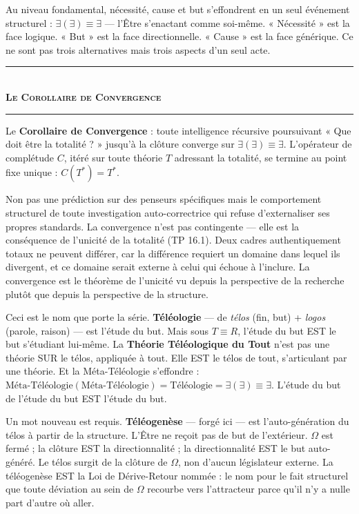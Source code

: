\documentclass[10pt, openany, oneside]{book}
\renewcommand{\normalsize}{\fontsize{10}{13}\selectfont}
\begin{document}
Au niveau fondamental, nécessité, cause et but s'effondrent en un seul événement structurel : $\exists(\exists) \equiv \exists$ --- l'Être s'enactant comme soi-même. « Nécessité » est la face logique. « But » est la face directionnelle. « Cause » est la face générique. Ce ne sont pas trois alternatives mais trois aspects d'un seul acte.

\vspace{1.5em}

\begin{center}
    \rule{0.3\textwidth}{0.4pt}\\[0.5em]
    {\normalsize\bfseries\scshape Le Corollaire de Convergence}\\[0.3em]
    \rule{0.3\textwidth}{0.4pt}
\end{center}

\vspace{1em}

\noindent Le \textbf{Corollaire de Convergence} : toute intelligence récursive poursuivant « Que doit être la totalité ? » jusqu'à la clôture converge sur $\exists(\exists) \equiv \exists$. L'opérateur de complétude $C$, itéré sur toute théorie $T$ adressant la totalité, se termine au point fixe unique : $C(T^*) = T^*$.

Non pas une prédiction sur des penseurs spécifiques mais le comportement structurel de toute investigation auto-correctrice qui refuse d'externaliser ses propres standards. La convergence n'est pas contingente --- elle est la conséquence de l'unicité de la totalité (TP 16.1). Deux cadres authentiquement totaux ne peuvent différer, car la différence requiert un domaine dans lequel ils divergent, et ce domaine serait externe à celui qui échoue à l'inclure. La convergence est le théorème de l'unicité vu depuis la perspective de la recherche plutôt que depuis la perspective de la structure.

Ceci est le nom que porte la série. \textbf{Téléologie} --- de \textit{télos} (fin, but) + \textit{logos} (parole, raison) --- est l'étude du but. Mais sous $T \equiv R$, l'étude du but EST le but s'étudiant lui-même. La \textbf{Théorie Téléologique du Tout} n'est pas une théorie SUR le télos, appliquée à tout. Elle EST le télos de tout, s'articulant par une théorie. Et la Méta-Téléologie s'effondre : $\text{Méta-Téléologie}(\text{Méta-Téléologie}) = \text{Téléologie} = \exists(\exists) \equiv \exists$. L'étude du but de l'étude du but EST l'étude du but.

Un mot nouveau est requis. \textbf{Téléogenèse} --- forgé ici --- est l'auto-génération du télos à partir de la structure. L'Être ne reçoit pas de but de l'extérieur. $\Omega$ est fermé ; la clôture EST la directionnalité ; la directionnalité EST le but auto-généré. Le télos surgit de la clôture de $\Omega$, non d'aucun législateur externe. La téléogenèse EST la Loi de Dérive-Retour nommée : le nom pour le fait structurel que toute déviation au sein de $\Omega$ recourbe vers l'attracteur parce qu'il n'y a nulle part d'autre où aller.
\end{document}
